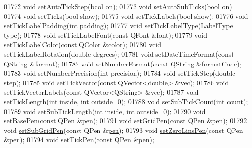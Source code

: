 \begin{DoxyCode}
01772   \textcolor{keywordtype}{void} setAutoTickStep(\textcolor{keywordtype}{bool} on);
01773   \textcolor{keywordtype}{void} setAutoSubTicks(\textcolor{keywordtype}{bool} on);
01774   \textcolor{keywordtype}{void} setTicks(\textcolor{keywordtype}{bool} show);
01775   \textcolor{keywordtype}{void} setTickLabels(\textcolor{keywordtype}{bool} show);
01776   \textcolor{keywordtype}{void} setTickLabelPadding(\textcolor{keywordtype}{int} padding);
01777   \textcolor{keywordtype}{void} setTickLabelType(LabelType type);
01778   \textcolor{keywordtype}{void} setTickLabelFont(\textcolor{keyword}{const} QFont &font);
01779   \textcolor{keywordtype}{void} setTickLabelColor(\textcolor{keyword}{const} QColor &\hyperlink{a00116_ae35093fbf4f645dcefd930ca8c68b622}{color});
01780   \textcolor{keywordtype}{void} setTickLabelRotation(\textcolor{keywordtype}{double} degrees);
01781   \textcolor{keywordtype}{void} setDateTimeFormat(\textcolor{keyword}{const} QString &format);
01782   \textcolor{keywordtype}{void} setNumberFormat(\textcolor{keyword}{const} QString &formatCode);
01783   \textcolor{keywordtype}{void} setNumberPrecision(\textcolor{keywordtype}{int} precision);
01784   \textcolor{keywordtype}{void} setTickStep(\textcolor{keywordtype}{double} step);
01785   \textcolor{keywordtype}{void} setTickVector(\textcolor{keyword}{const} QVector<double> &vec);
01786   \textcolor{keywordtype}{void} setTickVectorLabels(\textcolor{keyword}{const} QVector<QString> &vec);
01787   \textcolor{keywordtype}{void} setTickLength(\textcolor{keywordtype}{int} inside, \textcolor{keywordtype}{int} outside=0);
01788   \textcolor{keywordtype}{void} setSubTickCount(\textcolor{keywordtype}{int} count);
01789   \textcolor{keywordtype}{void} setSubTickLength(\textcolor{keywordtype}{int} inside, \textcolor{keywordtype}{int} outside=0);
01790   \textcolor{keywordtype}{void} setBasePen(\textcolor{keyword}{const} QPen &\hyperlink{a00116_a1f13fffa0a0faac34ec342973e613a4a}{pen});
01791   \textcolor{keywordtype}{void} setGridPen(\textcolor{keyword}{const} QPen &\hyperlink{a00116_a1f13fffa0a0faac34ec342973e613a4a}{pen});
01792   \textcolor{keywordtype}{void} \hyperlink{a00116_a48c20da07dee569fc3acae82c9278fa7}{setSubGridPen}(\textcolor{keyword}{const} QPen &\hyperlink{a00116_a1f13fffa0a0faac34ec342973e613a4a}{pen});
01793   \textcolor{keywordtype}{void} \hyperlink{a00116_a03ce49d4768a12a2f05fa292880d10e4}{setZeroLinePen}(\textcolor{keyword}{const} QPen &\hyperlink{a00116_a1f13fffa0a0faac34ec342973e613a4a}{pen});
01794   \textcolor{keywordtype}{void} setTickPen(\textcolor{keyword}{const} QPen &\hyperlink{a00116_a1f13fffa0a0faac34ec342973e613a4a}{pen});

\end{DoxyCode}
